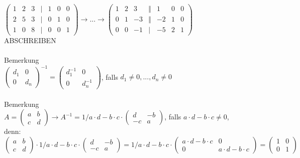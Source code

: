 \documentclass{scrartcl}
\begin{document}
	$\begin{pmatrix}
		1 & 2 & 3 & \vert & 1 & 0 & 0 \\
		2 & 5 & 3 & \vert & 0 & 1 & 0 \\
		1 & 0 & 8 & \vert & 0 & 0 & 1
	\end{pmatrix} \rightarrow ... \rightarrow \begin{pmatrix}
		1 & 2 & 3 & \Vert & 1 & 0 & 0 \\ 0 & 1 & -3 & \Vert & -2 & 1 & 0 \\ 0 & 0 & -1 & \vert & -5 & 2 & 1  
	\end{pmatrix}$
	\\ ABSCHREIBEN \\\\
	Bemerkung\\
	$\begin{pmatrix}
		d_1 & 0 \\ 0 & d_n
	\end{pmatrix} ^{-1} = \begin{pmatrix}
		d_1^{-1} & 0 \\ 0 & d_n^{-1}
	\end{pmatrix}$, falls $d_1 \not = 0 , ... , d_n \not = 0$\\\\
	Bemerkung\\
	$A = \begin{pmatrix}
		a & b \\ c & d
	\end{pmatrix} \rightarrow A^{-1} = 1 / {a \cdot d - b \cdot c} \cdot \begin{pmatrix}
		d & -b  \\ -c & a 
	\end{pmatrix}$, falls $a \cdot d - b \cdot c \not = 0$,\\ denn:\\
	$\begin{pmatrix}
		a & b \\ c & d
	\end{pmatrix} \cdot 1 / {a \cdot d - b \cdot c} \cdot \begin{pmatrix}
		d & -b \\ -c & a
	\end{pmatrix} = 1 / {a \cdot d - b \cdot c} \cdot \begin{pmatrix}
	a \cdot d - b \cdot c & 0 \\ 0 & a \cdot d - b  \cdot c
	\end{pmatrix} = \begin{pmatrix}
		1 & 0 \\ 0 & 1
	\end{pmatrix}$\\\\
\end{document}
